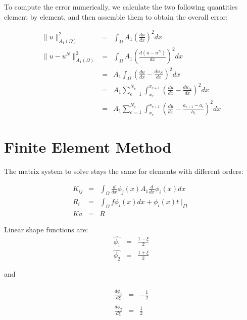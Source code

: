 \documentclass[paper=a4, fontsize=11pt]{article} %
\begin{document}
To compute the error numerically, we calculate the two following quantities element by element, and then assemble them to obtain the overall error:

\begin{eqnarray}
\| u \| _{A_1 (\Omega)}^2 &=&\int_{\Omega} A_1(\frac{du}{dx})^2 dx\nonumber\\
\| u -u^N \| _{A_1(\Omega)} ^2 &=& \int_{\Omega} A_1 (\frac{d(u-u^N)}{dx})^2 dx\nonumber\\
&=& A_1 \int_{\Omega} (\frac{du}{dx} - \frac{du_N}{dx})^2 dx\nonumber\\
&=& A_1 \sum_{e=1}^{N_e} \int_{x_e}^{x_{e+1}} (\frac{du}{dx} - \frac{du_N}{dx})^2 dx \nonumber\\
&=& A_1 \sum_{e=1}^{N_e} \int_{x_e}^{x_{e+1}} (\frac{du}{dx} - \frac{a_{i+1}-a_i}{h_i})^2 dx
\end{eqnarray}




\section{Finite Element Method}

The matrix system to solve stays the same for elements with different orders:
 
\begin{eqnarray}
K_{ij} &=& \int_{\Omega} \frac{d}{dx} \phi_j(x) A_1 \frac{d}{dx} \phi_i(x) dx \nonumber\\
R_i &=& \int_{\Omega} f \phi_i(x) dx + \phi_i(x) t \mid _{\Gamma t}\nonumber\\
K a &=& R
\end{eqnarray}

Linear shape functions are:
\begin{eqnarray}
\hat{\phi_1} &=& \frac{1-\xi}{2}\nonumber\\
\hat{\phi_2} &=& \frac{1+\xi}{2}
\end{eqnarray}

and

\begin{eqnarray}
\frac{d\hat{\phi_1}}{d\xi} &=& -\frac{1}{2}\nonumber\\
\frac{d\hat{\phi_2}}{d\xi} &=& \frac{1}{2}
\end{eqnarray}
\end{document}
